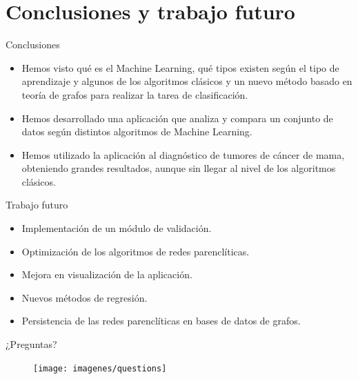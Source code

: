 \documentclass[hyperref={unicode}]{beamer}
\begin{document}
\section{Conclusiones y trabajo futuro}
\begin{frame}{Conclusiones}
	\begin{itemize}
	\item Hemos visto qué es el Machine Learning, qué tipos existen según el tipo de aprendizaje y algunos de los algoritmos clásicos y un nuevo método basado en teoría de grafos para realizar la tarea de clasificación. 
	
	\item Hemos desarrollado una aplicación que analiza y compara un conjunto de datos según distintos algoritmos de Machine Learning.
	
	\item Hemos utilizado la aplicación al diagnóstico de tumores de cáncer de mama, obteniendo grandes resultados, aunque sin llegar al nivel de los algoritmos clásicos.
	\end{itemize}
\end{frame}

\begin{frame}{Trabajo futuro}
	\begin{itemize}
		\item Implementación de un módulo de validación.
		
		\item Optimización de los algoritmos de redes parenclíticas.
		 
		\item Mejora en visualización de la aplicación.
		
		\item Nuevos métodos de regresión.
		
		\item Persistencia de las redes parenclíticas en bases de datos de grafos.
	\end{itemize}
\end{frame}

\begin{frame}{¿Preguntas?}
	\begin{figure}
	\begin{center}
		\texttt{[image: imagenes/questions]}
	\end{center}

	\end{figure}


\end{frame}
\end{document}
